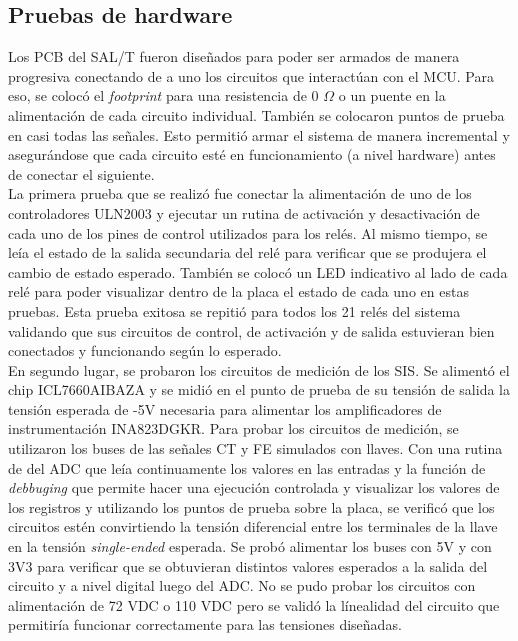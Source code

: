 \subsection{Pruebas de hardware}

Los PCB del SAL/T fueron diseñados para poder ser armados de manera progresiva conectando de a uno los circuitos que interactúan con el MCU. Para eso, se colocó el \textit{footprint} para una resistencia de 0 $\Omega$ o un puente en la alimentación de cada circuito individual. También se colocaron puntos de prueba en casi todas las señales. Esto permitió armar el sistema de manera incremental y asegurándose que cada circuito esté en funcionamiento (a nivel hardware) antes de conectar el siguiente.  \\ 

La primera prueba que se realizó fue conectar la alimentación de uno de los controladores ULN2003 y ejecutar un rutina de activación y desactivación de cada uno de los pines de control utilizados para los relés. Al mismo tiempo, se leía el estado de la salida secundaria del relé para verificar que se produjera el cambio de estado esperado. También se colocó un LED indicativo al lado de cada relé para poder visualizar dentro de la placa el estado de cada uno en estas pruebas. Esta prueba exitosa se repitió para todos los 21 relés del sistema validando que sus circuitos de control, de activación y de salida estuvieran bien conectados y funcionando según lo esperado. \\ 

En segundo lugar, se probaron los circuitos de medición de los SIS. Se alimentó el chip ICL7660AIBAZA y se midió en el punto de prueba de su tensión de salida la tensión esperada de -5V necesaria para alimentar los amplificadores de instrumentación INA823DGKR. Para probar los circuitos de medición, se utilizaron los buses de las señales CT y FE simulados con llaves. Con una rutina de del ADC que leía continuamente los valores en las entradas y la función de \textit{debbuging} que permite hacer una ejecución controlada y visualizar los valores de los registros y utilizando los puntos de prueba sobre la placa, se verificó que los circuitos estén convirtiendo la tensión diferencial entre los terminales de la llave en la tensión \textit{single-ended} esperada. Se probó alimentar los buses con 5V y con 3V3 para verificar que se obtuvieran distintos valores esperados a la salida del circuito y a nivel digital luego del ADC. No se pudo probar los circuitos con alimentación de 72 VDC o 110 VDC pero se validó la línealidad del circuito que permitiría funcionar correctamente para las tensiones diseñadas. \\ 



